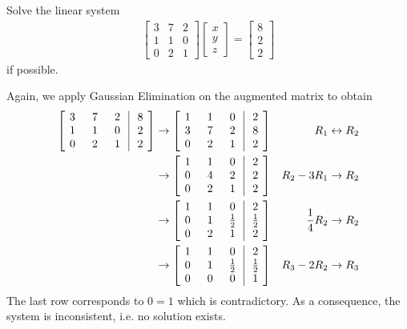 \begin{exmp}
\label{exmp:nosol}
Solve the linear system
\begin{align*}
\begin{bmatrix}
3 & 7 & 2 \\
1 & 1 & 0 \\
0 & 2 & 1 
\end{bmatrix}
\begin{bmatrix}
x \\
y \\
z
\end{bmatrix}
=
\begin{bmatrix}
8 \\
2 \\
2
\end{bmatrix}   
\end{align*}
if possible.
\end{exmp}
\begin{solution} Again, we apply Gaussian Elimination on the augmented matrix to obtain
\begin{align*}
\left[\begin{array}{@{\,}wc{10pt}wc{10pt}wc{10pt}|wc{10pt}@{\,}}
3 & 7 & 2 & 8 \\
1 & 1 & 0 & 2 \\
0 & 2 & 1 & 2
\end{array}\right] 
& \to 
\left[\begin{array}{@{\,}wc{10pt}wc{10pt}wc{10pt}|wc{10pt}@{\,}}
1 & 1 & 0 & 2 \\
3 & 7 & 2 & 8 \\
0 & 2 & 1 & 2
\end{array}\right] 
& R_1 \leftrightarrow R_2 \\
& \to 
\left[\begin{array}{@{\,}wc{10pt}wc{10pt}wc{10pt}|wc{10pt}@{\,}}
1 & 1 & 0 & 2 \\
0 & 4 & 2 & 2 \\
0 & 2 & 1 & 2
\end{array}\right] 
& R_2-3R_1 \to R_2 \\
& \to 
\left[\begin{array}{@{\,}wc{10pt}wc{10pt}wc{10pt}|wc{10pt}@{\,}}
1 & 1 & 0 & 2 \\
0 & 1 & \frac{1}{2} & \frac{1}{2} \\
0 & 2 & 1 & 2
\end{array}\right] 
& \frac{1}{4}R_2 \to R_2 \\
& \to 
\left[\begin{array}{@{\,}wc{10pt}wc{10pt}wc{10pt}|wc{10pt}@{\,}}
1 & 1 & 0 & 2 \\
0 & 1 & \frac{1}{2} & \frac{1}{2} \\
0 & 0 & 0 & 1
\end{array}\right] 
& R_3 - 2R_2 \to R_3
\end{align*}
The last row corresponds to $0 = 1$ which is contradictory. As a consequence, the system is inconsistent, i.e. no solution exists.
\end{solution}

